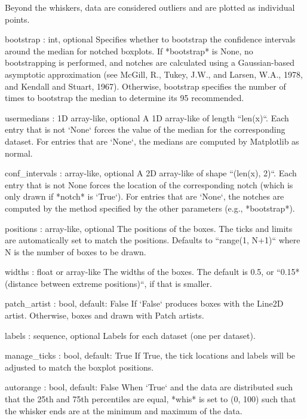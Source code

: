 \begin{DoxyVerb}
    Beyond the whiskers, data are considered outliers and are plotted
    as individual points.

bootstrap : int, optional
    Specifies whether to bootstrap the confidence intervals
    around the median for notched boxplots. If *bootstrap* is
    None, no bootstrapping is performed, and notches are
    calculated using a Gaussian-based asymptotic approximation
    (see McGill, R., Tukey, J.W., and Larsen, W.A., 1978, and
    Kendall and Stuart, 1967). Otherwise, bootstrap specifies
    the number of times to bootstrap the median to determine its
    95%
    recommended.

usermedians : 1D array-like, optional
    A 1D array-like of length ``len(x)``.  Each entry that is not
    `None` forces the value of the median for the corresponding
    dataset.  For entries that are `None`, the medians are computed
    by Matplotlib as normal.

conf_intervals : array-like, optional
    A 2D array-like of shape ``(len(x), 2)``.  Each entry that is not
    None forces the location of the corresponding notch (which is
    only drawn if *notch* is `True`).  For entries that are `None`,
    the notches are computed by the method specified by the other
    parameters (e.g., *bootstrap*).

positions : array-like, optional
    The positions of the boxes. The ticks and limits are
    automatically set to match the positions. Defaults to
    ``range(1, N+1)`` where N is the number of boxes to be drawn.

widths : float or array-like
    The widths of the boxes.  The default is 0.5, or ``0.15*(distance
    between extreme positions)``, if that is smaller.

patch_artist : bool, default: False
    If `False` produces boxes with the Line2D artist. Otherwise,
    boxes and drawn with Patch artists.

labels : sequence, optional
    Labels for each dataset (one per dataset).

manage_ticks : bool, default: True
    If True, the tick locations and labels will be adjusted to match
    the boxplot positions.

autorange : bool, default: False
    When `True` and the data are distributed such that the 25th and
    75th percentiles are equal, *whis* is set to (0, 100) such
    that the whisker ends are at the minimum and maximum of the data.


\end{DoxyVerb}
